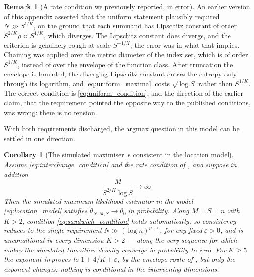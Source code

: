 \documentclass[11pt]{article}
\newtheorem{corollary}[corollary]{Corollary}
\theoremstyle{definition}
\newtheorem{remark}[remark]{Remark}
\newcommand{\thetao}{\theta_0}
\begin{document}
\begin{remark}[A rate condition we previously reported, in error]\label{rem:uniform_theta}
An earlier version of this appendix asserted that the uniform statement plausibly required $N\gg S^{2/K}$, on the ground that each summand has Lipschitz constant of order $S^{2/K}\rho\asymp S^{1/K}$, which diverges. The Lipschitz constant does diverge, and the criterion is genuinely rough at scale $S^{-1/K}$; the error was in what that implies. Chaining was applied over the metric diameter of the index set, which is of order $S^{1/K}$, instead of over the envelope of the function class. After truncation the envelope is bounded, the diverging Lipschitz constant enters the entropy only through its logarithm, and \eqref{eq:uniform_maximal} costs $\sqrt{\log S}$ rather than $S^{1/K}$. The correct condition is \eqref{eq:uniform_condition}, and the direction of the earlier claim, that the requirement pointed the opposite way to the published conditions, was wrong: there is no tension.
\end{remark}

With both requirements discharged, the argmax question in this model can be settled in one direction.

\begin{corollary}[The simulated maximiser is consistent in the location model]\label{cor:argmax_consistent}
Assume \eqref{eq:interchange_condition} and the rate condition of , and suppose in addition
\begin{equation}\label{eq:sandwich_condition}
\frac{M}{S^{2/K}\log S}\longrightarrow\infty .
\end{equation}
Then the simulated maximum likelihood estimator in the model \eqref{eq:location_model} satisfies $\widetilde\theta_{N,M,S}\to\thetao$ in probability. Along $M=S=n$ with $K>2$, condition \eqref{eq:sandwich_condition} holds automatically, so consistency reduces to the single requirement $N\gg(\log n)^{p+\varepsilon}$, for any fixed $\varepsilon>0$, and is unconditional in every dimension $K>2$ --- along the very sequence for which  makes the simulated transition density converge in probability to zero. For $K\ge5$ the exponent improves to $1+4/K+\varepsilon$, by the envelope route of , but only the exponent changes: nothing is conditional in the intervening dimensions.
\end{corollary}
\end{document}
